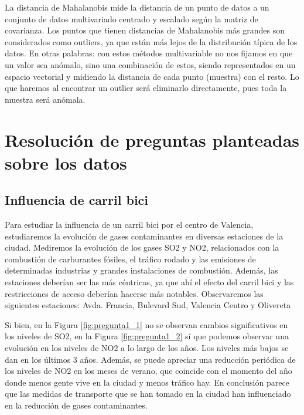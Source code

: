 \documentclass[notspecified,article,submit,moreauthors,pdftex]{Definitions/mdpi}
\begin{document}
La distancia de Mahalanobis mide la distancia de un punto de datos a un
conjunto de datos multivariado centrado y escalado según la matriz de
covarianza. Los puntos que tienen distancias de Mahalanobis más grandes
son considerados como outliers, ya que están más lejos de la
distribución típica de los datos. En otras palabras: con estos métodos
multivariable no nos fijamos en que un valor sea anómalo, sino una
combinación de estos, siendo representados en un espacio vectorial y
midiendo la distancia de cada punto (muestra) con el resto. Lo que
haremos al encontrar un outlier será eliminarlo directamente, pues toda
la muestra será anómala.

\hypertarget{resoluciuxf3n-de-preguntas-planteadas-sobre-los-datos}{%
\section{Resolución de preguntas planteadas sobre los
datos}\label{resoluciuxf3n-de-preguntas-planteadas-sobre-los-datos}}

\hypertarget{influencia-de-carril-bici}{%
\subsection{Influencia de carril bici}\label{influencia-de-carril-bici}}

Para estudiar la influencia de un carril bici por el centro de Valencia,
estudiaremos la evolución de gases contaminantes en diversas estaciones
de la ciudad. Mediremos la evolución de los gases SO2 y NO2,
relacionados con la combustión de carburantes fósiles, el tráfico rodado
y las emisiones de determinadas industrias y grandes instalaciones de
combustión. Además, las estaciones deberían ser las más céntricas, ya
que ahí el efecto del carril bici y las restricciones de acceso deberían
hacerse más notables. Observaremos las siguientes estaciones: Avda.
Francia, Bulevard Sud, Valencia Centro y Olivereta

Si bien, en la Figura \ref{fig:pregunta1_1} no se observan cambios
significativos en los niveles de SO2, en la Figura \ref{fig:pregunta1_2}
sí que podemos observar una evolución en los niveles de NO2 a lo largo
de los años. Los niveles más bajos se dan en los últimos 3 años. Además,
se puede apreciar una reducción periódica de los niveles de NO2 en los
meses de verano, que coincide con el momento del año donde menos gente
vive en la ciudad y menos tráfico hay. En conclusión parece que las
medidas de transporte que se han tomado en la ciudad han influenciado en
la reducción de gases contaminantes.
\end{document}
